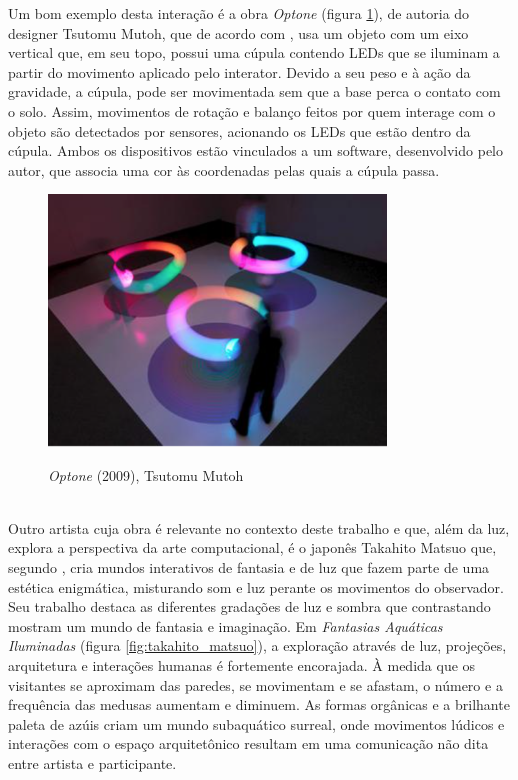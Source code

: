 Um bom exemplo desta interação é a obra \textit{Optone} (figura \ref{fig:tsutomu_mutoh}), de autoria do designer Tsutomu Mutoh, que de acordo com , usa um objeto com um eixo vertical que, em seu topo, possui uma cúpula contendo LEDs que se iluminam a partir do movimento aplicado pelo interator. Devido a seu peso e à ação da gravidade, a cúpula, pode ser movimentada sem que a base perca o contato com o solo. Assim, movimentos de rotação e balanço feitos por quem interage com o objeto são detectados por sensores, acionando os LEDs que estão dentro da cúpula. Ambos os dispositivos estão vinculados a um software, desenvolvido pelo autor, que associa uma cor às coordenadas pelas quais a cúpula passa.

\begin{figure}[H]
    \centering
    \caption{\textit{Optone} (2009), Tsutomu Mutoh}
	\vspace*{0,2cm}
    \includegraphics[width=0.8\textwidth]{./04-figuras/tsutomu_mutoh}
    \label{fig:tsutomu_mutoh}
\end{figure}
\vspace*{-0,9cm}
{\raggedright {}}\\

Outro artista cuja obra é relevante no contexto deste trabalho e que, além da luz, explora a perspectiva da arte computacional, é o japonês Takahito Matsuo que, segundo , cria mundos interativos de fantasia e de luz que fazem parte de uma estética enigmática, misturando som e luz perante os movimentos do observador. Seu trabalho destaca as diferentes gradações de luz e sombra que contrastando mostram um mundo de fantasia e imaginação. Em \textit{Fantasias Aquáticas Iluminadas} (figura \ref{fig:takahito_matsuo}), a exploração através de luz, projeções, arquitetura e interações humanas é fortemente encorajada. À medida que os visitantes se aproximam das paredes, se movimentam e se afastam, o número e a frequência das medusas aumentam e diminuem. As formas orgânicas e a brilhante paleta de azúis criam um mundo subaquático surreal, onde movimentos lúdicos e interações com o espaço arquitetônico resultam em uma comunicação não dita entre artista e participante. 


